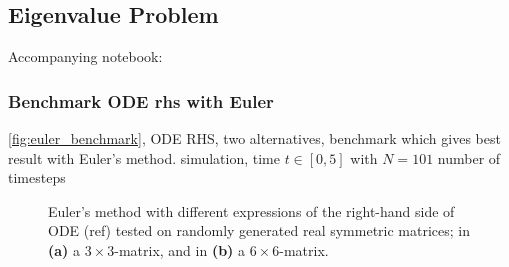 \subsection{Eigenvalue Problem}\label{sec:eigenvalue results}

Accompanying notebook: 


\subsubsection*{Benchmark ODE rhs with Euler}

\autoref{fig:euler_benchmark}, ODE RHS, two alternatives, benchmark which gives best result with Euler's method. simulation, time $t\in [0, 5]$ with $N = 101$ number of timesteps

\begin{figure}[H]
\centering
{}
\qquad
{}
\caption{Euler's method with different expressions of the right-hand side of ODE (ref) tested on randomly generated real symmetric matrices; in \textbf{(a)} a $3\times 3$-matrix, and in \textbf{(b)} a $6\times 6$-matrix.}
\label{fig:euler_benchmark}
\end{figure}

